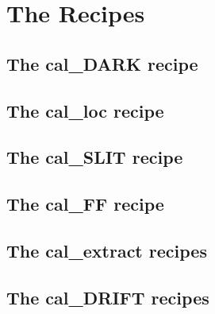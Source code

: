 \chapter{The Recipes}
\label{ch:the_recipes}


\section{The cal\_DARK recipe}
\label{ch:the_recipes:cal_DARK_spirou}


\section{The cal\_loc recipe}
\label{ch:the_recipes:cal_loc_RAW_spirou}


\section{The cal\_SLIT recipe}
\label{ch:the_recipes:cal_SLIT_spirou}


\section{The cal\_FF recipe}
\label{ch:the_recipes:cal_FF_RAW_spirou}


\section{The cal\_extract recipes}
\label{ch:the_recipes:cal_extract_RAW_spirou}


\section{The cal\_DRIFT recipes}
\label{ch:the_recipes:cal_DRIFT_RAW_spirou}


